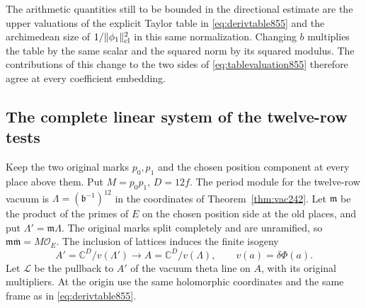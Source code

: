 \documentclass[a4paper,11pt]{article}
\theoremstyle{definition}
\theoremstyle{remark}
\numberwithin{equation}{section}
\begin{document}
The arithmetic quantities still to be bounded in the directional
estimate are the upper valuations of the explicit Taylor table
in \eqref{eq:derivtable855} and the archimedean size of
\(1/\|\phi_1\|_{\rm cl}^2\) in this same normalization. Changing
\(b\) multiplies the table by the same scalar and the squared
norm by its squared modulus. The contributions of this change
to the two sides of \eqref{eq:tablevaluation855} therefore agree
at every coefficient embedding.
\clearpage

\subsection{The complete linear system of the twelve-row tests}
\label{sec:completesystem856}
Keep the two original marks \(p_0,p_1\) and the chosen position
component at every place above them. Put \(M=p_0p_1\), \(D=12f\).
The period module for the twelve-row vacuum is
\(\Lambda=(\mathfrak b^{-1})^{12}\) in the coordinates of
Theorem~\ref{thm:vac242}. Let \(\mathfrak m\) be the product of
the primes of \(E\) on the chosen position side at the old places,
and put \(\Lambda'=\mathfrak m\Lambda\).
The original marks split completely and are unramified, so
\(\mathfrak m\overline{\mathfrak m}=M\mathcal O_E\).
The inclusion of lattices induces the finite isogeny
\[
       A'=\mathbb C^D/v(\Lambda')
             \longrightarrow A=\mathbb C^D/v(\Lambda),
             \qquad v(a)=\delta\Phi(a).
\]
Let \(\mathcal L\) be the pullback to \(A'\) of the vacuum
theta line on \(A\), with its original multipliers. At the
origin use the same holomorphic coordinates and the same frame
as in \eqref{eq:derivtable855}.
\end{document}
